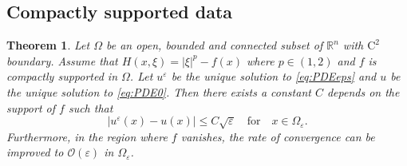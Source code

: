 \documentclass[11pt,reqno]{amsart}
\numberwithin{figure}{section}
\theoremstyle{plain}
\newtheorem{thm}{Theorem}[section]
\theoremstyle{remark}
\numberwithin{equation}{section}
\newcommand{\R}{\mathbb{R}}
\begin{document}
\subsection{Compactly supported data}
\begin{thm}\label{thm:rate_doubling0} Let $\Omega$ be an open, bounded and connected subset of $\R^n$ with $\mathrm{C}^2$ boundary. Assume that $H(x,\xi) = |\xi|^p - f(x)$ where $p\in\left(1,2\right)$ and $f$ is compactly supported in $\Omega$. Let $u^\varepsilon$ be the unique solution to \eqref{eq:PDEeps} and $u$ be the unique solution to \eqref{eq:PDE0}. Then there exists a constant $C$ depends on the support of $f$ such that
\begin{equation*}
|u^\varepsilon(x) - u(x)| \leq C\sqrt{\varepsilon} \quad  \text{for} \quad x\in \Omega_{\varepsilon}.
\end{equation*}
Furthermore, in the region where $f$ vanishes, the rate of convergence can be improved to $\mathcal{O}(\varepsilon)$ in $\Omega_\varepsilon$.
\end{thm}
\end{document}
